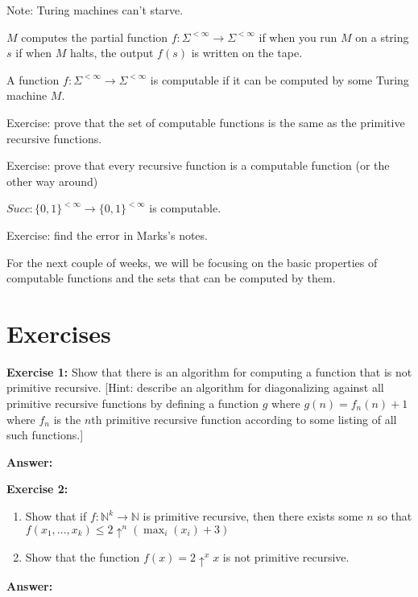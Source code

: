 %
Note: Turing machines can't starve.

$M$ computes the partial function $f:\Sigma^{<\infty} \to \Sigma^{<\infty}$ if when you run $M$ on a string $s$ if when $M$ halts, the output $f(s)$ is written on the tape.

A function $f: \Sigma^{<\infty} \to \Sigma^{<\infty}$ is computable if it can be computed by some Turing machine $M$.

Exercise: prove that the set of computable functions is the same as the primitive recursive functions.

Exercise: prove that every recursive function is a computable function (or the other way around)

$Succ : \{0, 1\}^{< \infty} \to  \{0, 1\}^{< \infty}$ is computable.

Exercise: find the error in Marks's notes.



For the next couple of weeks, we will be focusing on the basic properties of computable functions and the sets that can be computed by them.


\section{Exercises}

\noindent \textbf{Exercise 1:} Show that there is an algorithm for computing a function that is not primitive recursive.
[Hint: describe an algorithm for diagonalizing against all primitive recursive functions by defining a function $g$ where $g(n) = f_n(n) + 1$ where $f_n$ is the $n$th primitive recursive function according to some listing of all such functions.]

\vspace{2mm}
\noindent \textbf{Answer:}

\vspace{5mm}
\noindent \textbf{Exercise 2:}
\begin{enumerate}[label=(\alph*)]
    \item Show that if $f: \mathbb N ^k \to \mathbb N$ is primitive recursive, then there exists some $n$ so that $f(x_1, ..., x_k) \leq 2 \uparrow^n(\max_i(x_i) + 3)$
    \item Show that the function $f(x) = 2\uparrow^x x$ is not primitive recursive.
\end{enumerate}

\vspace{2mm}
\noindent \textbf{Answer:}


